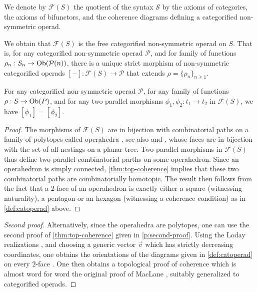 \begin{definition}
    We denote by $\mathcal{F}(S)$ the quotient of the syntax $\mathcal{S}$ by the axioms of categories, the axioms of bifunctors, and the coherence diagrams defining a categorified non-symmetric operad. 
\end{definition}

We obtain that $\mathcal{F}(S)$ is the free categorified non-symmetric operad on $S$. 
That is, for any categorified non-symmetric operad $\mathcal{P}$, and for family of functions $\rho_n : S_n \to \mathrm{Ob}(\mathcal{P}(n))$, there is a unique strict morphism of non-symmetric categorified operads $[-]:\mathcal{F}(S) \to \mathcal{P}$ that extends $\rho=\{\rho_n\}_{n\geq 1}$. 

\begin{thm}
\label{thm:coherence-operahedra}
    For any categorified non-symmetric operad $\mathcal{P}$, for any family of functions $\rho : S \to \mathrm{Ob}(P)$, and for any two parallel morphisms $\phi_1,\phi_2: t_1 \to t_2$ in $\mathcal{F}(S)$, we have $[\phi_1]=[\phi_2]$.
\end{thm}

\begin{proof}
The morphisms of $\mathcal{F}(S)$ are in bijection with combinatorial paths on a family of polytopes called operahedra \cite[Section 2.1]{laplante-anfossiDiagonalOperahedra2022a}, see also \cite[Section 13]{DP15} and \cite{curienSyntacticAspectsHypergraph2019a}, whose faces are in bijection with the set of all nestings on a planar tree. 
Two parallel morphisms in $\mathcal{F}(S)$ thus define two parallel combinatorial parths on some operahedron. 
Since an operahedron is simply connected, \cref{thm:top-coherence} implies that these two combinatorial paths are combinatorially homotopic. 
The result then follows from the fact that a $2$-face of an operahedron is exactly either a square (witnessing naturality), a pentagon or an hexagon (witnessing a coherence condition) as in \cref{def:catoperad} above.
\end{proof}

\begin{proof}[Second proof]
    Alternatively, since the operahedra are polytopes, one can use the second proof of \cref{thm:top-coherence} given in \cref{p:second-proof}. 
    Using the Loday realizations \cite[Section 2.2]{laplante-anfossiDiagonalOperahedra2022a}, and choosing a generic vector $\vec v$ which has strictly decreasing coordinates, one obtains the orientations of the diagrams given in \cref{def:catoperad} on every $2$-face \cite[Proposition 3.11]{laplante-anfossiDiagonalOperahedra2022a}.
    One then obtains a topological proof of coherence which is almost word for word the original proof of MacLane \cite[Theorem 3.1]{MacLane63}, suitably generalized to categorified operads. 
\end{proof}
   
